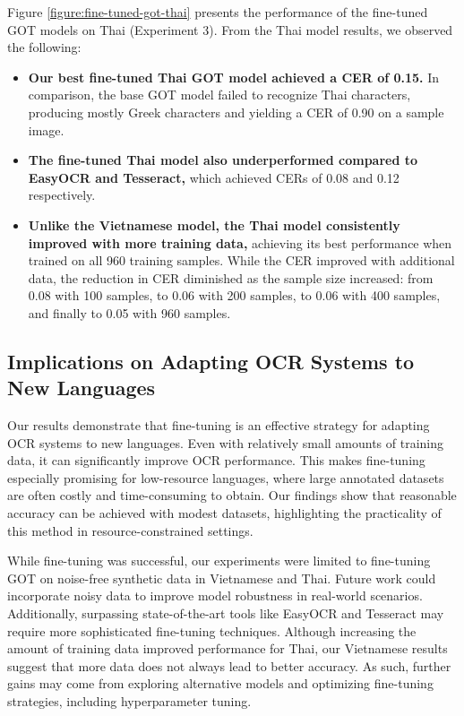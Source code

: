 \documentclass[12pt,oneside]{memoir}
\begin{document}
Figure \ref{figure:fine-tuned-got-thai} presents the performance of the fine-tuned GOT models on Thai (Experiment 3). From the Thai model results, we observed the following:

\begin{itemize}
    \item \textbf{Our best fine-tuned Thai GOT model achieved a CER of 0.15.}
    In comparison, the base GOT model failed to recognize Thai characters, producing mostly Greek characters and yielding a CER of 0.90 on a sample image.
    \item \textbf{The fine-tuned Thai model also underperformed compared to EasyOCR and Tesseract,} which achieved CERs of 0.08 and 0.12 respectively.
    \item \textbf{Unlike the Vietnamese model, the Thai model consistently improved with more training data,} achieving its best performance when trained on all 960 training samples. While the CER improved with additional data, the reduction in CER diminished as the sample size increased: from 0.08 with 100 samples, to 0.06 with 200 samples, to 0.06 with 400 samples, and finally to 0.05 with 960 samples.
\end{itemize}

\subsection{Implications on Adapting OCR Systems to New Languages}

Our results demonstrate that fine-tuning is an effective strategy for adapting OCR systems to new languages.
Even with relatively small amounts of training data, it can significantly improve OCR performance.
This makes fine-tuning especially promising for low-resource languages, where large annotated datasets are often costly and time-consuming to obtain.
Our findings show that reasonable accuracy can be achieved with modest datasets, highlighting the practicality of this method in resource-constrained settings.

While fine-tuning was successful, our experiments were limited to fine-tuning GOT on noise-free synthetic data in Vietnamese and Thai. 
Future work could incorporate noisy data to improve model robustness in real-world scenarios.
Additionally, surpassing state-of-the-art tools like EasyOCR and Tesseract may require more sophisticated fine-tuning techniques. 
Although increasing the amount of training data improved performance for Thai, our Vietnamese results suggest that more data does not always lead to better accuracy. 
As such, further gains may come from exploring alternative models and optimizing fine-tuning strategies, including hyperparameter tuning.
\end{document}
